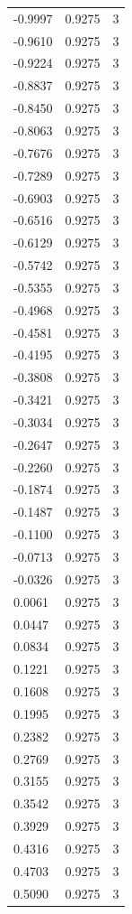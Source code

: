 \begin{longtable}{lrr}
  -0.9997 & 0.9275 & 3 \\
  -0.9610 & 0.9275 & 3 \\
  -0.9224 & 0.9275 & 3 \\
  -0.8837 & 0.9275 & 3 \\
  -0.8450 & 0.9275 & 3 \\
  -0.8063 & 0.9275 & 3 \\
  -0.7676 & 0.9275 & 3 \\
  -0.7289 & 0.9275 & 3 \\
  -0.6903 & 0.9275 & 3 \\
  -0.6516 & 0.9275 & 3 \\
  -0.6129 & 0.9275 & 3 \\
  -0.5742 & 0.9275 & 3 \\
  -0.5355 & 0.9275 & 3 \\
  -0.4968 & 0.9275 & 3 \\
  -0.4581 & 0.9275 & 3 \\
  -0.4195 & 0.9275 & 3 \\
  -0.3808 & 0.9275 & 3 \\
  -0.3421 & 0.9275 & 3 \\
  -0.3034 & 0.9275 & 3 \\
  -0.2647 & 0.9275 & 3 \\
  -0.2260 & 0.9275 & 3 \\
  -0.1874 & 0.9275 & 3 \\
  -0.1487 & 0.9275 & 3 \\
  -0.1100 & 0.9275 & 3 \\
  -0.0713 & 0.9275 & 3 \\
  -0.0326 & 0.9275 & 3 \\
  0.0061 & 0.9275 & 3 \\
  0.0447 & 0.9275 & 3 \\
  0.0834 & 0.9275 & 3 \\
  0.1221 & 0.9275 & 3 \\
  0.1608 & 0.9275 & 3 \\
  0.1995 & 0.9275 & 3 \\
  0.2382 & 0.9275 & 3 \\
  0.2769 & 0.9275 & 3 \\
  0.3155 & 0.9275 & 3 \\
  0.3542 & 0.9275 & 3 \\
  0.3929 & 0.9275 & 3 \\
  0.4316 & 0.9275 & 3 \\
  0.4703 & 0.9275 & 3 \\
  0.5090 & 0.9275 & 3 \\

\end{longtable}
